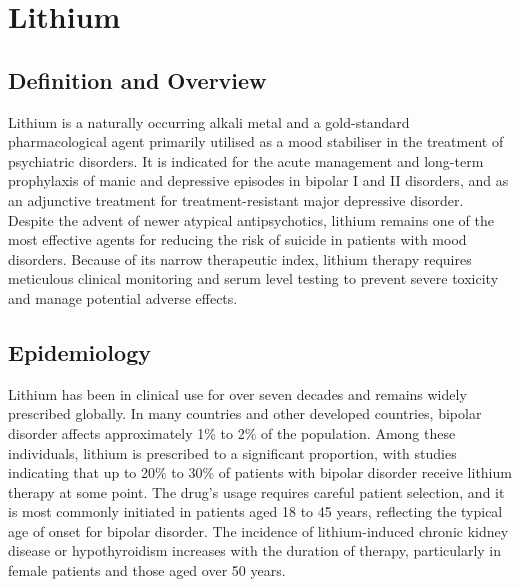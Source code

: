 \chapter{Lithium}

\section*{Definition and Overview}
Lithium is a naturally occurring alkali metal and a gold-standard pharmacological agent primarily utilised as a mood stabiliser in the treatment of psychiatric disorders. It is indicated for the acute management and long-term prophylaxis of manic and depressive episodes in bipolar I and II disorders, and as an adjunctive treatment for treatment-resistant major depressive disorder. Despite the advent of newer atypical antipsychotics, lithium remains one of the most effective agents for reducing the risk of suicide in patients with mood disorders. Because of its narrow therapeutic index, lithium therapy requires meticulous clinical monitoring and serum level testing to prevent severe toxicity and manage potential adverse effects.

\section*{Epidemiology}
Lithium has been in clinical use for over seven decades and remains widely prescribed globally. In many countries and other developed countries, bipolar disorder affects approximately 1\% to 2\% of the population. Among these individuals, lithium is prescribed to a significant proportion, with studies indicating that up to 20\% to 30\% of patients with bipolar disorder receive lithium therapy at some point. The drug's usage requires careful patient selection, and it is most commonly initiated in patients aged 18 to 45 years, reflecting the typical age of onset for bipolar disorder. The incidence of lithium-induced chronic kidney disease or hypothyroidism increases with the duration of therapy, particularly in female patients and those aged over 50 years.

